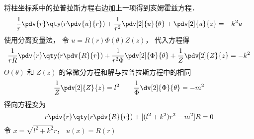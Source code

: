 
\begin{issues}
\issueDraft
\end{issues}


将柱坐标系中的拉普拉斯方程右边加上一项得到亥姆霍兹方程．
\begin{equation}
\frac{1}{r} \pdv{r} \qty(r\pdv{u}{r}) + \frac{1}{r^2} \pdv[2]{u}{\theta} + \pdv[2]{u}{z} = -k^2 u
\end{equation}
使用分离变量法， 令 $u = R(r) \Phi(\theta) Z(z)$， 代入方程得
\begin{equation}
\frac{1}{rR}\pdv{r} \qty(r\pdv{R}{r}) + \frac{1}{r^2 \Phi} \pdv[2]{\Phi}{\theta} + \frac{1}{Z} \pdv[2]{Z}{z} = -k^2
\end{equation}
$\Theta(\theta)$ 和 $Z(z)$ 的常微分方程和解与拉普拉斯方程中的相同
\begin{equation}
\frac{1}{Z} \pdv[2]{Z}{z} = l^2 \qquad
\frac{1}{\Phi } \dv[2]{\Phi}{\theta} = -m^2
\end{equation}
径向方程变为
\begin{equation}
r\pdv{r} \qty(r\pdv{R}{r}) + [(l^2 + k^2)r^2 - m^2]R  = 0
\end{equation}
令 $x = \sqrt{l^2 + k^2}r$， $u(x) = R(r)$
